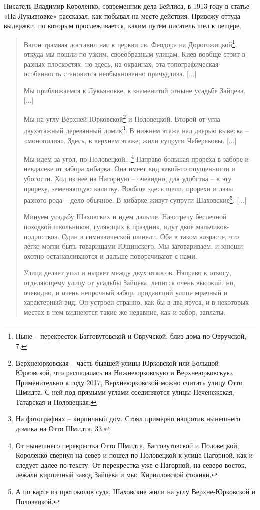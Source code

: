 Писатель Владимир Короленко, современник дела Бейлиса, в 1913 году в статье «На Лукьяновке» рассказал, как побывал на месте действия. Привожу оттуда выдержки, по которым прослеживается, каким путем писатель шел к пещере.

\begin{quotation}
Вагон трамвая доставил нас к церкви св. Феодора на Дорогожицкой\footnote{Ныне – перекресток Багговутовской и Овручской, близ дома по Овручской, 7.}, откуда мы пошли по узким, своеобразным улицам. Киев вообще стоит в разных плоскостях, но здесь, на окраинах, эта топографическая особенность становится необыкновенно причудлива. [...]

Мы приближаемся к Лукьяновке, к знаменитой отныне усадьбе Зайцева. [...]

Мы на углу Верхней Юрковской\footnote{Верхнеюрковская – часть бывшей улицы Юрковской или Большой Юрковской, что распадалась на Нижнеюрковскую и Верхнеюрковскую. Применительно к году 2017, Верхнеюрковской можно считать улицу Отто Шмидта. С ней под прямыми углами соединяются улицы Печенежская, Татарская и Половецкая.} и Половецкой. Второй от угла двухэтажный деревянный домик\footnote{На фотографиях – кирпичный дом. Стоял примерно напротив нынешнего домика на Отто Шмидта, 33.}. В нижнем этаже над дверью вывеска – «монополия». Здесь, в верхнем этаже, жили супруги Чеберяковы. [...]

Мы идем за угол, по Половецкой...\footnote{От нынешнего перекрестка Отто Шмидта, Багговутовской и Половецкой, Короленко свернул на север и пошел по Половецкой к улице Нагорной, как и следует далее по тексту. От перекрестка уже с Нагорной, на северо-восток, лежали кирпичный завод Зайцева и мыс Кирилловской стоянки.} Направо большая прореха в заборе и невдалеке от забора хибарка. Она имеет вид какой-то опущенности и убогости. Ход из нее на Нагорную – очевидно, для удобства – в эту прореху, заменяющую калитку. Вообще здесь щели, прорехи и лазы разного рода – дело обычное. В хибарке живут супруги Шаховские\footnote{А по карте из протоколов суда, Шаховские жили на углу Верхне-Юрковской и Половецкой.}. [...]

Минуем усадьбу Шаховских и идем дальше. Навстречу беспечной походкой школьников, гуляющих в праздник, идут двое мальчиков-подростков. Один в гимназической шинели. Оба в таком возрасте, что легко могли быть товарищами Ющинского. Мы заговариваем, и юноши охотно останавливаются и дальше поворачивают с нами.

Улица делает угол и ныряет между двух откосов. Направо к откосу, отделяющему улицу от усадьбы Зайцева, лепится очень высокий, но, очевидно, и очень непрочный забор, придающий улице мрачный и характерный вид. Он устроен странно, как бы в два яруса, и в некоторых местах в нем виднеются такие же недавние, как и забор, заплаты. 


\end{quotation}
